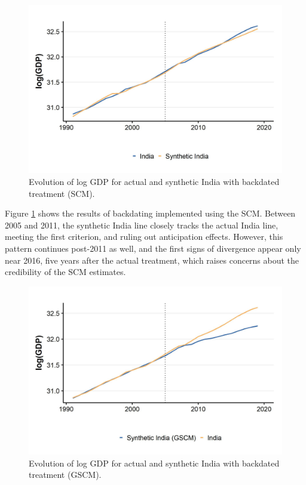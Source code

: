 \documentclass[12pt,nobind, a4paper]{reedthesis}
\begin{document}
 \newpage
 \begin{figure}

 {\centering \includegraphics[width=1\linewidth]{figure/indiasynthbd} 

 }

 \caption{Evolution of log GDP for actual and synthetic India with backdated treatment (SCM).}\label{fig:scmbd}
 \end{figure}
 Figure \ref{fig:scmbd} shows the results of backdating implemented using the SCM. Between 2005 and 2011, the synthetic India line closely tracks the actual India line, meeting the first criterion, and ruling out anticipation effects. However, this pattern continues post-2011 as well, and the first signs of divergence appear only near 2016, five years after the actual treatment, which raises concerns about the credibility of the SCM estimates.
 \newpage
 \begin{figure}

 {\centering \includegraphics[width=1\linewidth]{figure/indiagsynthbd} 

 }

 \caption{Evolution of log GDP for actual and synthetic India with backdated treatment (GSCM).}\label{fig:gscmbd}
 \end{figure}
\end{document}
